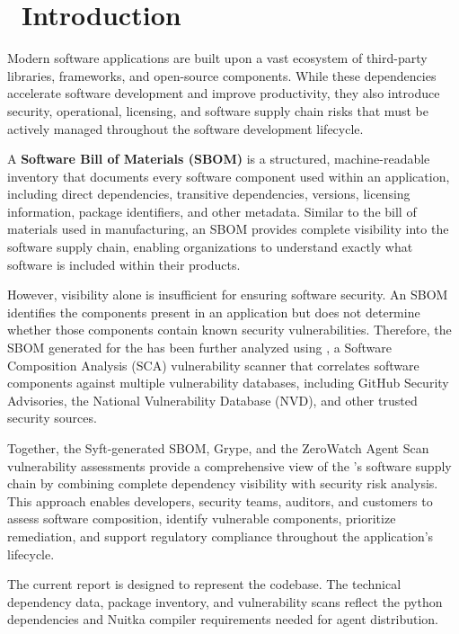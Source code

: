 
\chapter[Introduction]{\IconInfo\ Introduction}

Modern software applications are built upon a vast ecosystem of third-party libraries, frameworks, and open-source components. While these dependencies accelerate software development and improve productivity, they also introduce security, operational, licensing, and software supply chain risks that must be actively managed throughout the software development lifecycle.

A \textbf{Software Bill of Materials (SBOM)} is a structured, machine-readable inventory that documents every software component used within an application, including direct dependencies, transitive dependencies, versions, licensing information, package identifiers, and other metadata. Similar to the bill of materials used in manufacturing, an SBOM provides complete visibility into the software supply chain, enabling organizations to understand exactly what software is included within their products.

However, visibility alone is insufficient for ensuring software security. An SBOM identifies the components present in an application but does not determine whether those components contain known security vulnerabilities. Therefore, the SBOM generated for the \textbf{\ProjectName} has been further analyzed using \textbf{\VulScanner}, a Software Composition Analysis (SCA) vulnerability scanner that correlates software components against multiple vulnerability databases, including GitHub Security Advisories, the National Vulnerability Database (NVD), and other trusted security sources.

Together, the Syft-generated SBOM, Grype, and the ZeroWatch Agent Scan vulnerability assessments provide a comprehensive view of the \ProjectName's software supply chain by combining complete dependency visibility with security risk analysis. This approach enables developers, security teams, auditors, and customers to assess software composition, identify vulnerable components, prioritize remediation, and support regulatory compliance throughout the application's lifecycle.

\vspace{0.4cm}
\begin{tcolorbox}[colback=ZWLightGray,colframe=ZWTeal,arc=6pt,title=\textbf{\IconInfo\ SBOM Scope \& Context}]
The current report is designed to represent the \textbf{\ProjectName} codebase. The technical dependency data, package inventory, and vulnerability scans reflect the python dependencies and Nuitka compiler requirements needed for agent distribution.
\end{tcolorbox}
\vspace{0.4cm}

